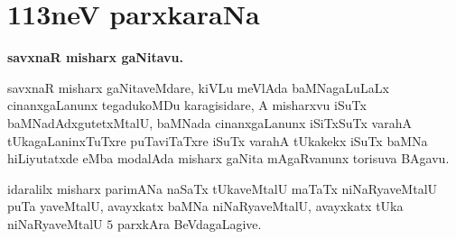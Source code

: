 \chapter{113neV parxkaraNa}

\begin{center}
{\bf\large savxnaR misharx gaNitavu.}
\end{center}

savxnaR misharx gaNitaveMdare, kiVLu meVlAda baMNagaLuLaLx cinanxgaLanunx tegadukoMDu karagisidare, A misharxvu iSuTx baMNadAdxgutetxMtalU, baMNada cinanxgaLanunx iSiTxSuTx varahA tUkagaLaninxTuTxre puTaviTaTxre iSuTx varahA tUkakekx iSuTx baMNa hiLiyutatxde eMba modalAda misharx gaNita mAgaRvanunx torisuva BAgavu.

idaralilx misharx parimANa naSaTx tUkaveMtalU maTaTx niNaRyaveMtalU puTa yaveMtalU, avayxkatx baMNa niNaRyaveMtalU, avayxkatx tUka niNaRyaveMtalU $5$ parxkAra BeVdagaLagive.
